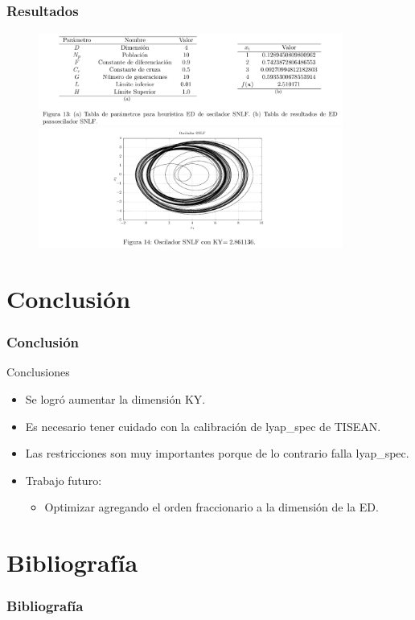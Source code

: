 \documentclass[10pt]{beamer}
\begin{document}
	
	\begin{frame}
		\frametitle{Resultados}

		
		\begin{figure}[hbtp]
			\centering
			\includegraphics[width = 10cm]{ex4a.png}
			\includegraphics[width = 10cm]{ex4b.png}
		\end{figure}
	\end{frame}


	\section{Conclusión}
	\begin{frame}
		\frametitle{Conclusión}
		\begin{block}{Conclusiones}
			\begin{itemize}
				\item Se logró aumentar la dimensión KY.
				\item Es necesario tener cuidado con la calibración de lyap\_{}spec de TISEAN. 
				
				\item Las restricciones son muy importantes porque de lo contrario falla lyap\_{}spec.

				\item Trabajo futuro:
					\begin{itemize}
						\item Optimizar agregando el orden fraccionario a la dimensión de la ED.
					\end{itemize}

			\end{itemize}
		\end{block}
	\end{frame}	
	
	
	
	
	
	
	
	
	
	\section{Bibliografía}
	\begin{frame}[t, allowframebreaks]
		\frametitle{Bibliografía}
		\nocite{*}
		
		
	\end{frame}
	
	
\end{document}

